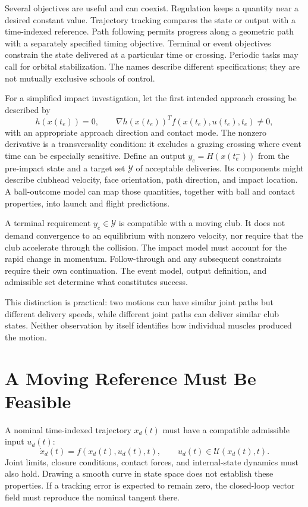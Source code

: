 Several objectives are useful and can coexist. Regulation keeps a quantity
near a desired constant value. Trajectory tracking compares the state or output
with a time-indexed reference. Path following permits progress along a geometric
path with a separately specified timing objective. Terminal or event objectives
constrain the state delivered at a particular time or crossing. Periodic tasks
may call for orbital stabilization. The names describe different specifications;
they are not mutually exclusive schools of control.

For a simplified impact investigation, let the first intended approach crossing
be described by
\begin{equation}
 h(x(t_e))=0,\qquad \nabla h(x(t_e))^Tf(x(t_e),u(t_e),t_e)\ne0,
 \label{eq:motion_impact_event}
\end{equation}
with an appropriate approach direction and contact mode. The nonzero derivative
is a transversality condition: it excludes a grazing crossing where event time
can be especially sensitive. Define an output $y_e=H(x(t_e^-))$ from the
pre-impact state and a target set $\mathcal Y$ of acceptable deliveries. Its
components might describe clubhead velocity, face orientation, path direction,
and impact location. A ball-outcome model can map those quantities, together
with ball and contact properties, into launch and flight predictions.

A terminal requirement $y_e\in\mathcal Y$ is compatible with a moving club.
It does not demand convergence to an equilibrium with nonzero velocity, nor
require that the club accelerate through the collision. The impact model must
account for the rapid change in momentum. Follow-through and any subsequent
constraints require their own continuation. The event model, output definition,
and admissible set determine what constitutes success.

This distinction is practical: two motions can have similar joint paths but
different delivery speeds, while different joint paths can deliver similar
club states. Neither observation by itself identifies how individual muscles
produced the motion.

\section{A Moving Reference Must Be Feasible}

A nominal time-indexed trajectory $x_d(t)$ must have a compatible admissible
input $u_d(t)$:
\begin{equation}
 \dot x_d(t)=f(x_d(t),u_d(t),t),\qquad u_d(t)\in\mathcal U(x_d(t),t).
 \label{eq:motion_nominal_feasibility}
\end{equation}
Joint limits, closure conditions, contact forces, and internal-state dynamics
must also hold. Drawing a smooth curve in state space does not establish these
properties. If a tracking error is expected to remain zero, the closed-loop
vector field must reproduce the nominal tangent there.

